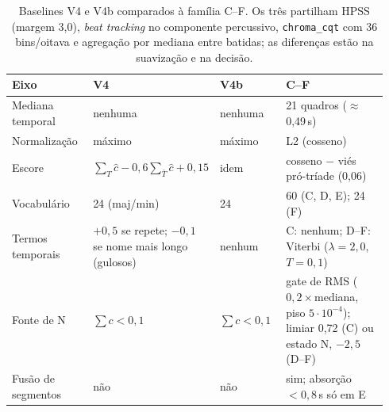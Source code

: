 \begin{table}[t]
  \centering
  \caption{Baselines V4 e V4b comparados à família C--F. Os três partilham HPSS (margem 3,0), \emph{beat tracking} no componente percussivo, \texttt{chroma\_cqt} com 36 bins/oitava e agregação por mediana entre batidas; as diferenças estão na suavização e na decisão.}
  \label{tab:baselines}
  \footnotesize
  \setlength{\tabcolsep}{3pt}
  \begin{tabular}{@{}p{0.22\linewidth}p{0.22\linewidth}p{0.18\linewidth}p{0.32\linewidth}@{}}
    \toprule
    Eixo & V4 & V4b & C--F \\
    \midrule
    Mediana temporal & nenhuma & nenhuma & 21 quadros ($\approx$0,49\,s) \\
    Normalização & máximo & máximo & L2 (cosseno) \\
    Escore & $\sum_{T}\hat c-0{,}6\sum_{\bar T}\hat c+0{,}15$ & idem & cosseno $-$ viés pró-tríade (0,06) \\
    Vocabulário & 24 (maj/min) & 24 & 60 (C, D, E); 24 (F) \\
    Termos temporais & $+0{,}5$ se repete; $-0{,}1$ se nome mais longo (gulosos) & nenhum & C: nenhum; D--F: Viterbi ($\lambda=2{,}0$, $T=0{,}1$) \\
    Fonte de N & $\sum c<0{,}1$ & $\sum c<0{,}1$ & gate de RMS ($0{,}2\times$mediana, piso $5\cdot10^{-4}$); limiar 0,72 (C) ou estado N, $-2{,}5$ (D--F) \\
    Fusão de segmentos & não & não & sim; absorção $<0{,}8$\,s só em E \\
    \bottomrule
  \end{tabular}
\end{table}
